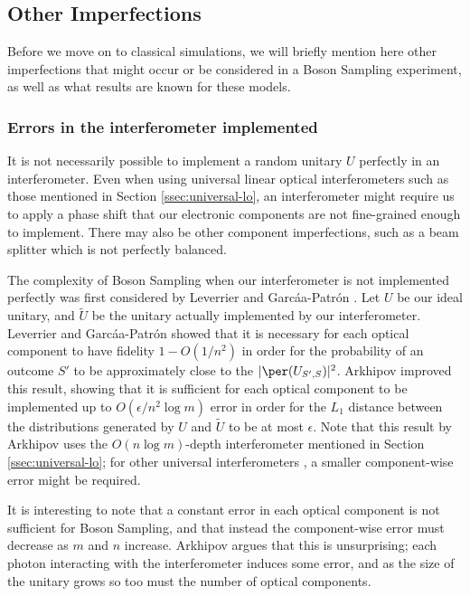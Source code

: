 \subsection{Other Imperfections}

Before we move on to classical simulations, we will briefly mention here other imperfections that might occur or be considered in a Boson Sampling experiment, as well as what results are known for these models.

\subsubsection{Errors in the interferometer implemented}

It is not necessarily possible to implement a random unitary $U$ perfectly in an interferometer. Even when using universal linear optical interferometers such as those mentioned in Section \ref{ssec:universal-lo}, an interferometer might require us to apply a phase shift that our electronic components are not fine-grained enough to implement. There may also be other component imperfections, such as a beam splitter which is not perfectly balanced.

The complexity of Boson Sampling when our interferometer is not implemented perfectly was first considered by Leverrier and Garc\'{a}a-Patr\'{o}n \cite{leverrier2015}. Let $U$ be our ideal unitary, and $\tilde{U}$ be the unitary actually implemented by our interferometer. Leverrier and Garc\'{a}a-Patr\'{o}n showed that it is necessary for each optical component to have fidelity $1-O(1/n^2)$ in order for the probability of an outcome $S'$ to be approximately close to the $|\per(U_{S',S})|^2$. Arkhipov \cite{arkhipov2015} improved this result, showing that it is sufficient for each optical component to be implemented up to $O(\epsilon/n^2\log m)$ error in order for the $L_1$ distance between the distributions generated by $U$ and $\tilde{U}$ to be at most $\epsilon$. Note that this result by Arkhipov uses the $O(n\log m)$-depth interferometer mentioned in Section \ref{ssec:universal-lo}; for other universal interferometers \cite{hurwitz1897, reck1994, clements2016}, a smaller component-wise error might be required.

It is interesting to note that a constant error in each optical component is not sufficient for Boson Sampling, and that instead the component-wise error must decrease as $m$ and $n$ increase. Arkhipov argues that this is unsurprising; each photon interacting with the interferometer induces some error, and as the size of the unitary grows so too must the number of optical components.

